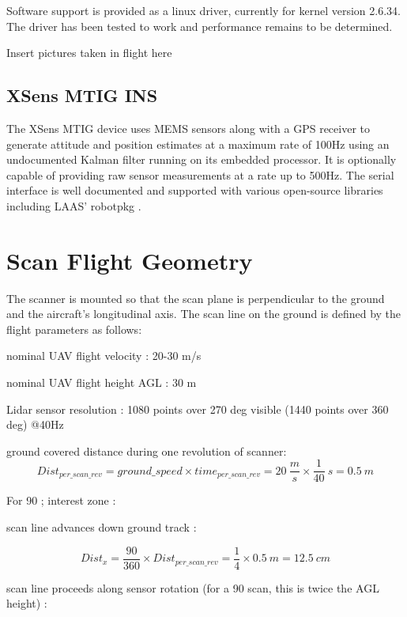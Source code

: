 \documentclass[a4paper,11pt]{report}
\begin{document}
Software support is provided as a linux driver, currently for kernel version 2.6.34. The driver has been tested to work and performance remains to be determined.

Insert pictures taken in flight here

\subsection{XSens MTIG INS}
\label{MTIG}

The XSens MTIG device uses MEMS sensors along with a GPS receiver to generate attitude and position estimates at a maximum rate of 100Hz using an undocumented Kalman filter running on its embedded processor. It is optionally capable of providing raw sensor measurements at a rate up to 500Hz. The serial interface is well documented and supported with various open-source libraries including LAAS' robotpkg \cite{robotpkg}.


\section{Scan Flight Geometry}
\label{geometry}

The scanner is mounted so that the scan plane is perpendicular to the ground and the aircraft's longitudinal axis. The scan line on the ground is defined by the flight parameters as follows:

nominal UAV flight velocity : 20-30 m/s

nominal UAV flight height AGL : 30 m

Lidar sensor resolution : 1080 points over 270 deg visible (1440 points over 360 deg) @40Hz

ground covered distance during one revolution of scanner:
\begin{equation}
Dist_{per\_scan\_rev} = ground\_speed \times time_{per\_scan\_rev} = 20~\frac{m}{s} \times \frac{1}{40}~s = 0.5~m 
\end{equation}

For 90 \degree; interest zone :

scan line advances down ground track :

\begin{equation} 
Dist_{x}=  \frac{90}{360} \times Dist_{per\_scan\_rev} = \frac{1}{4} \times 0.5~m = 12.5~cm
\end{equation}

scan line proceeds along sensor rotation (for a 90 scan, this is twice the AGL height) :
\end{document}
